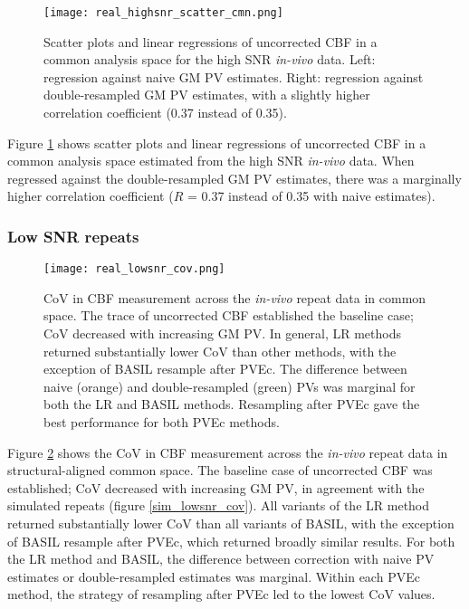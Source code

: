 \begin{figure}[H]
\centering
\texttt{[image: real\_highsnr\_scatter\_cmn.png]}
\caption{Scatter plots and linear regressions of uncorrected CBF in a common analysis space for the high SNR \textit{in-vivo} data. Left: regression against naive GM PV estimates. Right: regression against double-resampled GM PV estimates, with a slightly higher correlation coefficient (0.37 instead of 0.35).}
\label{real_highsnr_scatter_cmn}
\end{figure}

Figure \ref{real_highsnr_scatter_cmn} shows scatter plots and linear regressions of uncorrected CBF in a common analysis space estimated from the high SNR \textit{in-vivo} data. When regressed against the double-resampled GM PV estimates, there was a marginally higher correlation coefficient ($R$ = 0.37 instead of 0.35 with naive estimates). 

%


\subsubsection{Low SNR repeats}


\begin{figure}[H]
\centering
\texttt{[image: real\_lowsnr\_cov.png]}
\caption{CoV in CBF measurement across the \textit{in-vivo} repeat data in common space. The trace of uncorrected CBF established the baseline case; CoV decreased with increasing GM PV. In general, LR methods returned substantially lower CoV than other methods, with the exception of BASIL resample after PVEc. The difference between naive (orange) and double-resampled (green) PVs was marginal for both the LR and BASIL methods. Resampling after PVEc gave the best performance for both PVEc methods.}
\label{real_lowsnr_cov}
\end{figure}

Figure \ref{real_lowsnr_cov} shows the CoV in CBF measurement across the \textit{in-vivo} repeat data in structural-aligned common space. The baseline case of uncorrected CBF was established; CoV decreased with increasing GM PV, in agreement with the simulated repeats (figure \ref{sim_lowsnr_cov}). All variants of the LR method returned substantially lower CoV than all variants of BASIL, with the exception of BASIL resample after PVEc, which returned broadly similar results. For both the LR method and BASIL, the difference between correction with naive PV estimates or double-resampled estimates was marginal. Within each PVEc method, the strategy of resampling after PVEc led to the lowest CoV values. 

